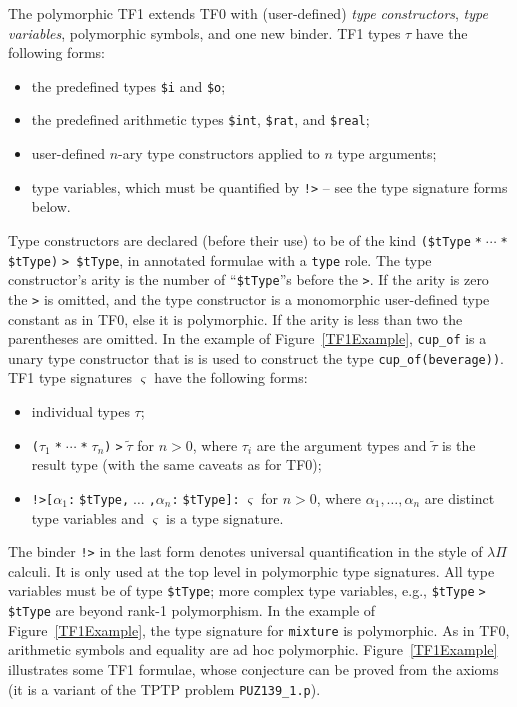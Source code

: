 \documentclass{easychair}
\begin{document}
The polymorphic TF1 extends TF0 with (user-defined) {\em type constructors}, 
{\em type variables}, polymorphic symbols, and one new binder.
TF1 types $\tau$ have the following forms:
\begin{itemize}
\item the predefined types {\tt \$i} and {\tt \$o};
\item the predefined arithmetic types {\tt \$int}, {\tt \$rat}, and 
      {\tt \$real};
\item user-defined $n$-ary type constructors applied to $n$ type arguments;
\item type variables, which must be quantified by {\tt !>} -- see the type
      signature forms below.
\end{itemize}
Type constructors are declared (before their use) to be of the kind
{\tt (\$tType$\;$*$\;{\cdots}\;$*$\;$\$tType)$\;$> \$tType}, in annotated 
formulae with a {\tt type} role.
The type constructor's arity is the number of ``{\tt \$tType}''s before
the {\tt >}.
If the arity is zero the {\tt >} is omitted, and the type constructor is
a monomorphic user-defined type constant as in TF0, else it is polymorphic.
If the arity is less than two the parentheses are omitted.
In the example of Figure~\ref{TF1Example}, {\tt cup\_of} is a unary type
constructor that is is used to construct the type {\tt cup\_of(beverage))}.
TF1 type signatures $\varsigma$ have the following forms:
\begin{itemize}
\item individual types $\tau$;
\item {\tt ($\tau_1\;$*$\;{\cdots}\;$*$\;\tau_n$)$\;$>$\;\tilde \tau$}
      for $n > 0$, where $\tau_i$ are the argument types and $\tilde \tau$
      is the result type (with the same caveats as for TF0);
\item {\tt !>[$\alpha_1$:$\;$\$tType,$\;{\dots}\;$,$\alpha_n$:$\;$\$tType]:$\;\varsigma$}
      for $n > 0$, where $\alpha_1,\dots,\alpha_n$ are distinct
      type variables and $\varsigma$ is a type signature.
\end{itemize}
The binder {\tt !>} in the last form denotes universal quantification in the
style of $\lambda\Pi$ calculi.
It is only used at the top level in polymorphic type signatures.
All type variables must be of type {\tt \$tType}; more complex type variables,
e.g., {\tt \$tType$\;$>$\;$\$tType} are beyond rank-1 polymorphism.
In the example of Figure~\ref{TF1Example}, the type signature for {\tt mixture}
is polymorphic.
As in TF0, arithmetic symbols and equality are ad hoc polymorphic.
Figure~\ref{TF1Example} illustrates some TF1 formulae, whose conjecture can
be proved from the axioms (it is a variant of the TPTP problem 
{\tt PUZ139\_1.p}).
\end{document}
